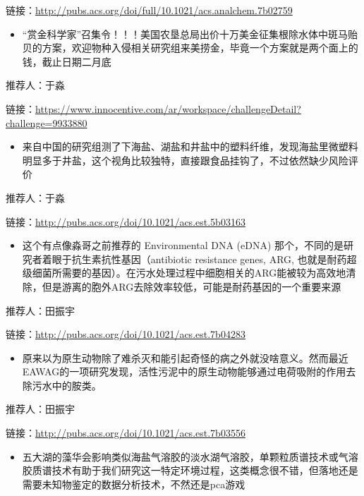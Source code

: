 \documentclass[]{book}
\providecommand{\tightlist}{%
  \setlength{\itemsep}{0pt}\setlength{\parskip}{0pt}}
\begin{document}
链接：\url{http://pubs.acs.org/doi/full/10.1021/acs.analchem.7b02759}

\begin{itemize}
\tightlist
\item
  ``赏金科学家''召集令！！！美国农垦总局出价十万美金征集根除水体中斑马贻贝的方案，欢迎物种入侵相关研究组来美捞金，毕竟一个方案就是两个面上的钱，截止日期二月底
\end{itemize}

推荐人：于淼

链接：\url{https://www.innocentive.com/ar/workspace/challengeDetail?challenge=9933880}

\begin{itemize}
\tightlist
\item
  来自中国的研究组测了下海盐、湖盐和井盐中的塑料纤维，发现海盐里微塑料明显多于井盐，这个视角比较独特，直接跟食品挂钩了，不过依然缺少风险评价
\end{itemize}

推荐人：于淼

链接：\url{http://pubs.acs.org/doi/10.1021/acs.est.5b03163}

\begin{itemize}
\tightlist
\item
  这个有点像淼哥之前推荐的 Environmental DNA (eDNA) 那个，不同的是研究者着眼于抗生素抗性基因（antibiotic resistance genes, ARG, 也就是耐药超级细菌所需要的基因）。在污水处理过程中细胞相关的ARG能被较为高效地清除，但是游离的胞外ARG去除效率较低，可能是耐药基因的一个重要来源
\end{itemize}

推荐人：田振宇

链接：\url{http://pubs.acs.org/doi/10.1021/acs.est.7b04283}

\begin{itemize}
\tightlist
\item
  原来以为原生动物除了难杀灭和能引起奇怪的病之外就没啥意义。然而最近EAWAG的一项研究发现，活性污泥中的原生动物能够通过电荷吸附的作用去除污水中的胺类。
\end{itemize}

推荐人：田振宇

链接：\url{http://pubs.acs.org/doi/10.1021/acs.est.7b03556}

\begin{itemize}
\tightlist
\item
  五大湖的藻华会影响类似海盐气溶胶的淡水湖气溶胶，单颗粒质谱技术或气溶胶质谱技术有助于我们研究这一特定环境过程，这类概念很不错，但落地还是需要未知物鉴定的数据分析技术，不然还是pca游戏
\end{itemize}
\end{document}
